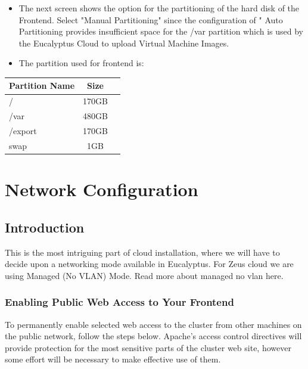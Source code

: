 \begin{itemize}
\item The next screen shows the option for the partitioning of the hard disk of the Frontend. Select "Manual Partitioning" since the configuration of " Auto Partitioning provides insufficient space for the /var partition which is used by the Eucalyptus Cloud to upload Virtual Machine Images.

\item The partition used for frontend is: \\ 
\end{itemize}

\begin{center}
\begin{tabular}{ | l | c | r |}
    \hline
    Partition Name & Size  \\ \hline
    /&170GB \\ 
    /var&480GB \\
	/export&170GB \\
	swap&1GB    \\
    \hline
  \end{tabular}
\end{center}




\chapter{Network Configuration}

\section{Introduction}
This is the most intriguing part of cloud installation, where we will have to decide upon a networking mode available in Eucalyptus. For Zeus cloud we are using Managed (No VLAN) Mode. Read more about managed no vlan here\cite{managednovlan}.

\subsection{Enabling Public Web Access to Your Frontend}

To permanently enable selected web access to the cluster from other machines on the public network, follow the steps below. Apache's access control directives will provide protection for the most sensitive parts of the cluster web site, however some effort will be necessary to make effective use of them.

